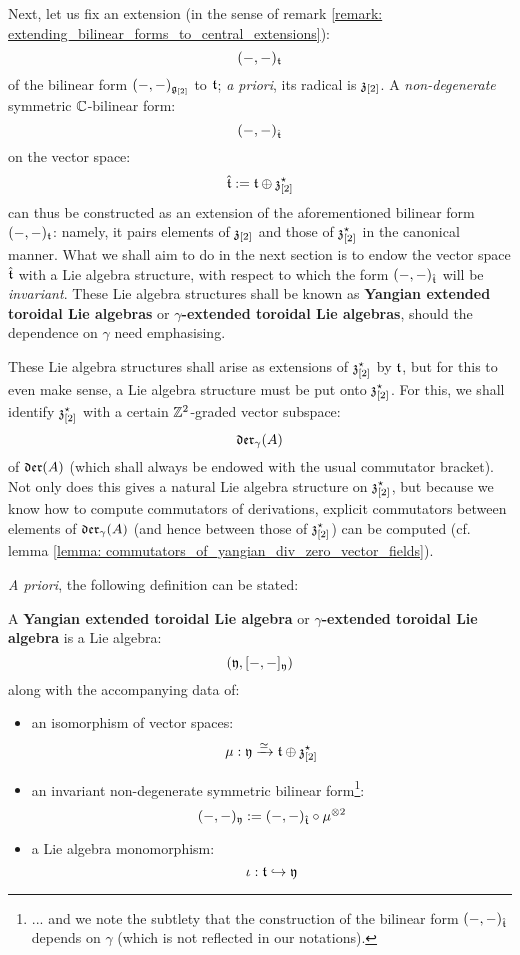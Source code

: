         Next, let us fix an extension (in the sense of remark \ref{remark: extending_bilinear_forms_to_central_extensions}):
            $$(-, -)_{\mathfrak{t}}$$
        of the bilinear form $(-, -)_{\mathfrak{g}_{[2]}}$ to $\mathfrak{t}$; \textit{a priori}, its radical is $\mathfrak{z}_{[2]}$. A \textit{non-degenerate} symmetric $\mathbb{C}$-bilinear form:
            $$(-, -)_{\hat{\mathfrak{t}}}$$
        on the vector space:
            $$\hat{\mathfrak{t}} := \mathfrak{t} \oplus \mathfrak{z}_{[2]}^{\star}$$
        can thus be constructed as an extension of the aforementioned bilinear form $(-, -)_{\mathfrak{t}}$: namely, it pairs elements of $\mathfrak{z}_{[2]}$ and those of $\mathfrak{z}_{[2]}^{\star}$ in the canonical manner. What we shall aim to do in the next section is to endow the vector space $\hat{\mathfrak{t}}$ with a Lie algebra structure, with respect to which the form $(-, -)_{\hat{\mathfrak{t}}}$ will be \textit{invariant}. These Lie algebra structures shall be known as \textbf{Yangian extended toroidal Lie algebras} or \textbf{$\gamma$-extended toroidal Lie algebras}, should the dependence on $\gamma$ need emphasising.

        These Lie algebra structures shall arise as extensions of $\mathfrak{z}_{[2]}^{\star}$ by $\mathfrak{t}$, but for this to even make sense, a Lie algebra structure must be put onto $\mathfrak{z}_{[2]}^{\star}$. For this, we shall identify $\mathfrak{z}_{[2]}^{\star}$ with a certain $\mathbb{Z}^2$-graded vector subspace:
            $$\mathfrak{der}_{\gamma}(A)$$
        of $\mathfrak{der}(A)$ (which shall always be endowed with the usual commutator bracket). Not only does this gives a natural Lie algebra structure on $\mathfrak{z}_{[2]}^{\star}$, but because we know how to compute commutators of derivations, explicit commutators between elements of $\mathfrak{der}_{\gamma}(A)$ (and hence between those of $\mathfrak{z}_{[2]}^{\star}$) can be computed (cf. lemma \ref{lemma: commutators_of_yangian_div_zero_vector_fields}).

        \textit{A priori}, the following definition can be stated:
        \begin{definition} \label{def: yangian_extended_toroidal_lie_algebras}
            A \textbf{Yangian extended toroidal Lie algebra} or \textbf{$\gamma$-extended toroidal Lie algebra} is a Lie algebra:
                $$(\mathfrak{y}, [-, -]_{\mathfrak{y}})$$
            along with the accompanying data of:
            \begin{itemize}
                \item an isomorphism of vector spaces:
                    $$\mu: \mathfrak{y} \xrightarrow[]{\simeq} \mathfrak{t} \oplus \mathfrak{z}_{[2]}^{\star}$$
                \item an invariant non-degenerate symmetric bilinear form\footnote{... and we note the subtlety that the construction of the bilinear form $(-, -)_{\hat{\mathfrak{t}}}$ depends on $\gamma$ (which is not reflected in our notations).}:
                    $$(-, -)_{\fraky} := (-, -)_{\extendedtoroidal} \circ \mu^{\tensor 2}$$
                \item a Lie algebra monomorphism:
                    $$\iota: \mathfrak{t} \hookrightarrow \mathfrak{y}$$
            \end{itemize}
        \end{definition}


